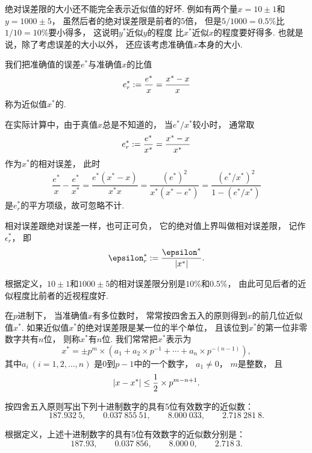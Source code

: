 绝对误差限的大小还不能完全表示近似值的好坏.
例如有两个量\(x = 10\pm1\)和\(y = 1000\pm5\)，
虽然后者的绝对误差限是前者的5倍，
但是\(5/1000 = 0.5\%\)比\(1/10 = 10\%\)要小得多，
这说明\(y^*\)近似\(y\)的程度
比\(x^*\)近似\(x\)的程度要好得多.
也就是说，除了考虑误差的大小以外，
还应该考虑准确值\(x\)本身的大小.

我们把准确值的误差\(e^*\)与准确值\(x\)的比值\begin{equation}
	e^*_r
	:= \frac{e^*}{x}
	= \frac{x^* - x}{x}
\end{equation}
称为近似值\(x^*\)的.

在实际计算中，由于真值\(x\)总是不知道的，
当\(e^* / x^*\)较小时，
通常取\begin{equation}
	e^*_r
	:= \frac{e^*}{x^*}
	= \frac{x^* - x}{x^*}
\end{equation}
作为\(x^*\)的相对误差，
此时\begin{equation*}
	\frac{e^*}{x}
	- \frac{e^*}{x^*}
	= \frac{e^* (x^* - x)}{x^* x}
	= \frac{(e^*)^2}{x^* (x^* - e^*)}
	= \frac{(e^* / x^*)^2}{1 - (e^* / x^*)}
\end{equation*}
是\(e^*_r\)的平方项级，故可忽略不计.

相对误差跟绝对误差一样，也可正可负，
它的绝对值上界叫做相对误差限，
记作\(\epsilon^*_r\)，
即\begin{equation}
	\epsilon^*_r
	\defeq \frac{\epsilon^*}{\abs{x^*}}.
\end{equation}

根据定义，\(10\pm1\)和\(1000\pm5\)的相对误差限分别是\(10\%\)和\(0.5\%\)，
由此可见后者的近似程度比前者的近视程度好.

在\(p\)进制下，
当准确值\(x\)有多位数时，
常常按四舍五入的原则得到\(x\)的前几位近似值\(x^*\).
如果近似值\(x^*\)的绝对误差限是某一位的半个单位，
且该位到\(x^*\)的第一位非零数字共有\(n\)位，
则称\(x^*\)有\(n\)位.
我们常常把\(x^*\)表示为\begin{equation*}
	x^*
	= \pm p^m \times (
		a_1
		+ a_2 \times p^{-1}
		+ \dotsb
		+ a_n \times p^{-(n-1)}
	),
\end{equation*}
其中\(a_i\ (i=1,2,\dotsc,n)\)
是\(0\)到\(p-1\)中的一个数字，
\(a_1\neq0\)，
\(m\)是整数，
且\begin{equation*}
	\abs{x - x^*}
	\leq \frac12 \times p^{m-n+1}.
\end{equation*}

\begin{example}
按四舍五入原则写出下列十进制数字的具有5位有效数字的近似数：\begin{equation*}
	187.932~5, \qquad
	0.037~855~51, \qquad
	8.000~033, \qquad
	2.718~281~8.
\end{equation*}
\begin{solution}
根据定义，上述十进制数字的具有5位有效数字的近似数分别是：\begin{equation*}
	187.93, \qquad
	0.037~856, \qquad
	8.000~0, \qquad
	2.718~3.
\end{equation*}
\end{solution}
\end{example}

